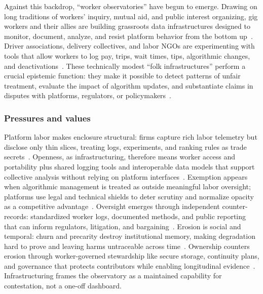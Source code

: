 \documentclass[acmsmall,screen]{acmart}
\begin{document}
Against this backdrop, ``worker observatories'' have begun to emerge. Drawing on long traditions of workers' inquiry, mutual aid, and public interest organizing, gig workers and their allies are building grassroots data infrastructures designed to monitor, document, analyze, and resist platform behavior from the bottom up~\cite{calacciOrganizingEndEmployment2022,calacciBargainingBlackBoxDesigning2022,vincentDataStrikesEvaluating2019}. Driver associations, delivery collectives, and labor NGOs are experimenting with tools that allow workers to log pay, trips, wait times, tips, algorithmic changes, and deactivations~\cite{hernandezEndDayAm2024,doDesigningGigWorker2024,hsiehGig2GetherDatasharingEmpower2025}. These technically modest ``folk infrastructures'' perform a crucial epistemic function: they make it possible to detect patterns of unfair treatment, evaluate the impact of algorithm updates, and substantiate claims in disputes with platforms, regulators, or policymakers~\cite{dalalLessonsWorkersInquiry2024,nagarajraoRideshareTransparencyTranslating2025,calacciAccessUnderstandingCollective2023}.

\subsubsection*{Pressures and values}
Platform labor makes enclosure structural: firms capture rich labor telemetry but disclose only thin slices, treating logs, experiments, and ranking rules as trade secrets~\cite{jarrahiAlgorithmicManagementWork2021,steinYouAreYou2023}. Openness, as infrastructuring, therefore means worker access and portability plus shared logging tools and interoperable data models that support collective analysis without relying on platform interfaces~\cite{calacciAccessUnderstandingCollective2023,hsiehGig2GetherDatasharingEmpower2025}. Exemption appears when algorithmic management is treated as outside meaningful labor oversight; platforms use legal and technical shields to deter scrutiny and normalize opacity as a competitive advantage~\cite{calacciBargainingBlackBoxDesigning2022,vincentDataLeverageFramework2021a}. Oversight emerges through independent counter-records: standardized worker logs, documented methods, and public reporting that can inform regulators, litigation, and bargaining~\cite{nagarajraoRideshareTransparencyTranslating2025,dalalLessonsWorkersInquiry2024}. Erosion is social and temporal: churn and precarity destroy institutional memory, making degradation hard to prove and leaving harms untraceable across time~\cite{hernandezEndDayAm2024,binnsNotEvenNice2025}. Ownership counters erosion through worker-governed stewardship like secure storage, continuity plans, and governance that protects contributors while enabling longitudinal evidence~\cite{calacciAccessUnderstandingCollective2023,steinYouAreYou2023}. Infrastructuring frames the observatory as a maintained capability for contestation, not a one-off dashboard.
\end{document}
